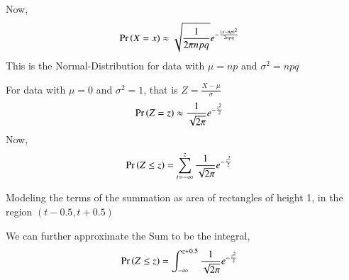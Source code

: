 \documentclass[journal,12pt,twocolumn]{IEEEtran}
\begin{document}
Now,
\begin{align}
    \Pr\left(X=x\right) &\approx \sqrt{\frac{1}{2\pi npq}} e^{-\frac{(x-np)^2}{2npq}}
\end{align}
This is the Normal-Distribution for data with $\mu=np$ and $\sigma^2=npq$

For data with $\mu=0$ and $\sigma^2=1$, that is $Z=\frac{X-\mu}{\sigma}$
\begin{align}
    \Pr\left(Z=z\right) &\approx \frac{1}{\sqrt{2\pi}}e^{-\frac{z^2}{2}}
\end{align}
Now,
\begin{align}
    \Pr\left(Z \le z\right)&= \sum_{t=-\infty}^z \frac{1}{\sqrt{2\pi}}e^{-\frac{z^2}{2}}
\end{align}

Modeling the terms of the summation as area of rectangles of height 1, in the region $(t-0.5,t+0.5)$

We can further approximate the Sum to be the integral,
\begin{align}
    \Pr\left(Z \le z\right)&= \int_{-\infty}^{z+0.5} \frac{1}{\sqrt{2\pi}}e^{-\frac{z^2}{2}}
\end{align}
\end{document}
